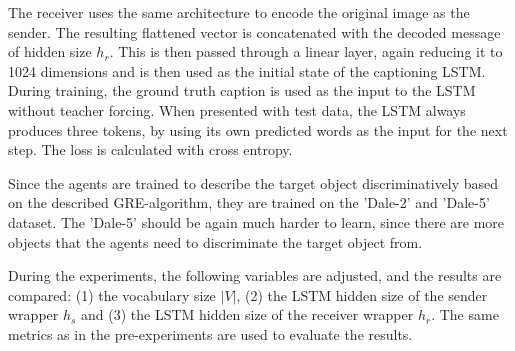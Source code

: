 The receiver uses the same architecture to encode the original image as the sender.
The resulting flattened vector is concatenated with the decoded message of hidden size $h_r$.
This is then passed through a linear layer, again reducing it to 1024 dimensions and is then used as the initial state of the captioning LSTM.
During training, the ground truth caption is used as the input to the LSTM without teacher forcing.
When presented with test data, the LSTM always produces three tokens, by using its own predicted words as the input for the next step.
The loss is calculated with cross entropy.

Since the agents are trained to describe the target object discriminatively based on the described GRE-algorithm, they are trained on the 'Dale-2' and 'Dale-5' dataset.
The 'Dale-5' should be again much harder to learn, since there are more objects that the agents need to discriminate the target object from.

During the experiments, the following variables are adjusted, and the results are compared:
(1) the vocabulary size $|V|$,
(2) the LSTM hidden size of the sender wrapper $h_s$ and
(3) the LSTM hidden size of the receiver wrapper $h_r$.
The same metrics as in the pre-experiments are used to evaluate the results.

